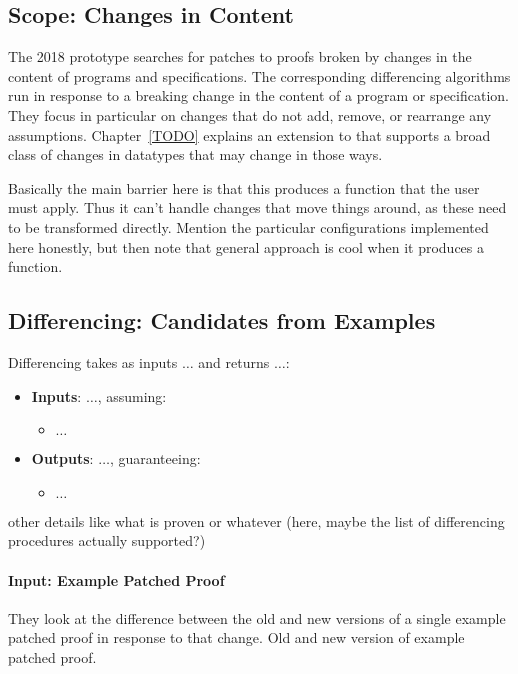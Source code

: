 \subsection{Scope: Changes in Content}
\label{sec:pumpkin-scope}

The 2018 \sysname prototype searches for patches to proofs broken by changes in the content of programs and specifications.
The corresponding differencing algorithms run in response to a breaking change in the content of a program or specification. %
They focus in particular on changes that do not add, remove, or rearrange any assumptions.
Chapter~\ref{TODO} explains an extension to \sysname that supports a broad class of
changes in datatypes that may change in those ways.

Basically the main barrier here is that this produces a function that the user must apply.
Thus it can't handle changes that move things around, as these need to be transformed directly.
Mention the particular configurations implemented here honestly, but then note that general approach is cool when it produces a function.

\subsection{Differencing: Candidates from Examples}
\label{sec:pumpkin-spec-diff}

Differencing takes as inputs $\ldots$ and returns $\ldots$:

\begin{itemize}
\item \textbf{Inputs}: $\ldots$, assuming:
\begin{itemize}
\item $\ldots$
\end{itemize}
\item \textbf{Outputs}: $\ldots$, guaranteeing:
\begin{itemize}
\item $\ldots$
\end{itemize}
\end{itemize}

other details like what is proven or whatever (here, maybe the list of differencing procedures actually supported?)

\iffalse
\paragraph{Input: Example Patched Proof}
They look at the difference between the old and new versions of a single example patched proof in response to that change.
Old and new version of example patched proof.

